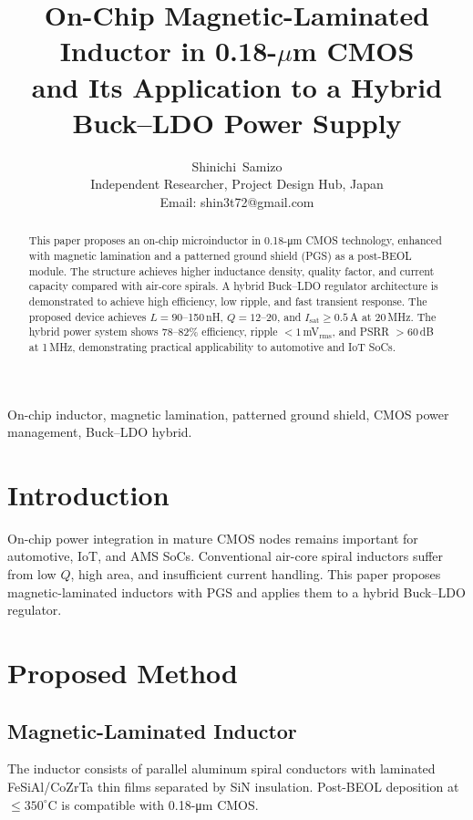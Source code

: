 \documentclass[journal]{IEEEtran}
\begin{document}
\title{On-Chip Magnetic-Laminated Inductor in 0.18-\texorpdfstring{$\mu$}{µ}m CMOS\\
and Its Application to a Hybrid Buck--LDO Power Supply}

\author{Shinichi~Samizo\\
Independent Researcher, Project Design Hub, Japan\\
Email: shin3t72@gmail.com}

\maketitle

\begin{abstract}
This paper proposes an on-chip microinductor in 0.18-\si{\micro m} CMOS technology, enhanced with magnetic lamination and a patterned ground shield (PGS) as a post-BEOL module. The structure achieves higher inductance density, quality factor, and current capacity compared with air-core spirals. A hybrid Buck--LDO regulator architecture is demonstrated to achieve high efficiency, low ripple, and fast transient response. The proposed device achieves $L=90$--150\,nH, $Q=12$--20, and $I_\text{sat}\geq 0.5$\,A at 20\,MHz. The hybrid power system shows 78--82\% efficiency, ripple $<1$\,mV$_\text{rms}$, and PSRR $>60$\,dB at 1\,MHz, demonstrating practical applicability to automotive and IoT SoCs.
\end{abstract}

\begin{IEEEkeywords}
On-chip inductor, magnetic lamination, patterned ground shield, CMOS power management, Buck--LDO hybrid.
\end{IEEEkeywords}

\section{Introduction}
On-chip power integration in mature CMOS nodes remains important for automotive, IoT, and AMS SoCs. Conventional air-core spiral inductors suffer from low $Q$, high area, and insufficient current handling. This paper proposes magnetic-laminated inductors with PGS and applies them to a hybrid Buck--LDO regulator.

\section{Proposed Method}
\subsection{Magnetic-Laminated Inductor}
The inductor consists of parallel aluminum spiral conductors with laminated FeSiAl/CoZrTa thin films separated by SiN insulation. Post-BEOL deposition at $\leq 350^{\circ}$C is compatible with 0.18-\si{\micro m} CMOS.
\end{document}
